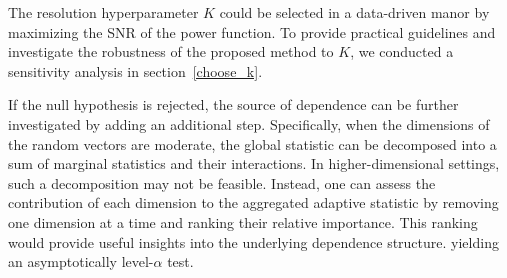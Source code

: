 \documentclass[12pt,reqno,oneside]{amsbook}
\theoremstyle{definition}
\theoremstyle{remark}
\begin{document}
The resolution hyperparameter $K$ could be selected in a data-driven manor by maximizing the SNR of the power function. To provide practical guidelines and investigate the robustness of the proposed method to $K$, we conducted a sensitivity analysis in section~\ref{choose_k}.

If the null hypothesis is rejected, the source of dependence can be further investigated by adding an additional step. Specifically, when the dimensions of the random vectors are moderate, the global statistic can be decomposed into a sum of marginal statistics and their interactions. In higher-dimensional settings, such a decomposition may not be feasible. Instead, one can assess the contribution of each dimension to the aggregated adaptive statistic by removing one dimension at a time and ranking their relative importance. This ranking would provide useful insights into the underlying dependence structure.
yielding an asymptotically level-$\alpha$ test.
\end{document}
